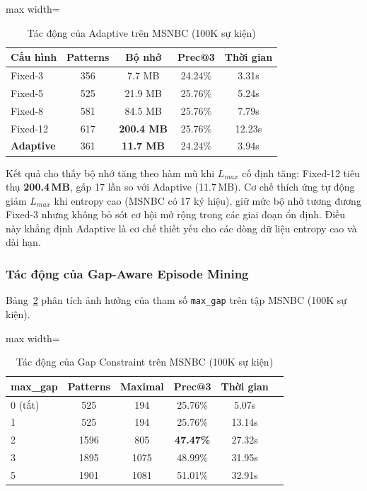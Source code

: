 \documentclass{article}
\begin{document}
\begin{table}[htbp]
    \centering
    \caption{Tác động của Adaptive trên MSNBC (100K sự kiện)}
    \label{tab:ablation_adaptive}
    \begin{adjustbox}{max width=\columnwidth}
\begin{tabular}{lcccc}
        \toprule
        \textbf{Cấu hình} & \textbf{Patterns} & \textbf{Bộ nhớ} & \textbf{Prec@3} & \textbf{Thời gian} \\
        \midrule
        Fixed-3  & 356 & 7.7 MB   & 24.24\% & 3.31s \\
        Fixed-5  & 525 & 21.9 MB  & 25.76\% & 5.24s \\
        Fixed-8  & 581 & 84.5 MB  & 25.76\% & 7.79s \\
        Fixed-12 & 617 & \textbf{200.4 MB} & 25.76\% & 12.23s \\
        \midrule
        \textbf{Adaptive} & 361 & \textbf{11.7 MB} & 24.24\% & 3.94s \\
        \bottomrule
    \end{tabular}
\end{adjustbox}
\end{table}

Kết quả cho thấy bộ nhớ tăng theo hàm mũ khi $L_{max}$ cố định tăng: Fixed-12 tiêu thụ \textbf{200.4\,MB}, gấp 17 lần so với Adaptive (11.7\,MB). Cơ chế thích ứng tự động giảm $L_{max}$ khi entropy cao (MSNBC có 17 ký hiệu), giữ mức bộ nhớ tương đương Fixed-3 nhưng không bỏ sót cơ hội mở rộng trong các giai đoạn ổn định. Điều này khẳng định Adaptive là cơ chế thiết yếu cho các dòng dữ liệu entropy cao và dài hạn.

\subsubsection{Tác động của Gap-Aware Episode Mining}
Bảng~\ref{tab:ablation_gap} phân tích ảnh hưởng của tham số \texttt{max\_gap} trên tập MSNBC (100K sự kiện).

\begin{table}[htbp]
    \centering
    \caption{Tác động của Gap Constraint trên MSNBC (100K sự kiện)}
    \label{tab:ablation_gap}
    \begin{adjustbox}{max width=\columnwidth}
\begin{tabular}{lccccc}
        \toprule
        \textbf{max\_gap} & \textbf{Patterns} & \textbf{Maximal} & \textbf{Prec@3} & \textbf{Thời gian} \\
        \midrule
        0 (tắt)  & 525  & 194  & 25.76\% & 5.07s  \\
        1        & 525  & 194  & 25.76\% & 13.14s \\
        2        & 1596 & 805  & \textbf{47.47\%} & 27.32s \\
        3        & 1895 & 1075 & 48.99\% & 31.95s \\
        5        & 1901 & 1081 & 51.01\% & 32.91s \\
        \bottomrule
    \end{tabular}
\end{adjustbox}
\end{table}
\end{document}
